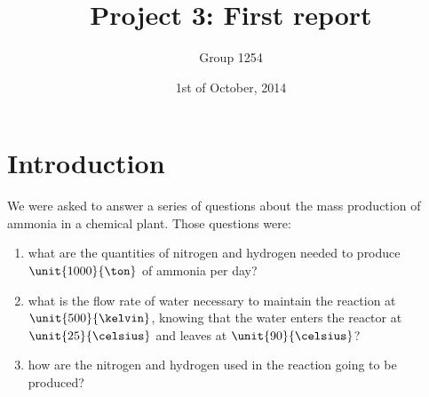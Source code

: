 \documentclass[a4paper,12pt, oneside]{article}
\title{Project 3: First report}
\author{Group 1254}
\date{1st of October, 2014}
\begin{document}
\maketitle

\tableofcontents

\section*{Introduction}

We were asked to answer a series of questions about the mass production of ammonia in a chemical plant. Those questions were:
\begin{enumerate}
 \item what are the quantities of nitrogen and hydrogen needed to produce $\unit{1000}{\ton}$ of ammonia per day?
 \item what is the flow rate of water necessary to maintain the reaction at $\unit{500}{\kelvin}$, knowing that the water enters the reactor at $\unit{25}{\celsius}$ and leaves at  $\unit{90}{\celsius}$?
 \item how are the nitrogen and hydrogen used in the reaction going to be produced?
\end{enumerate}


\end{document}
